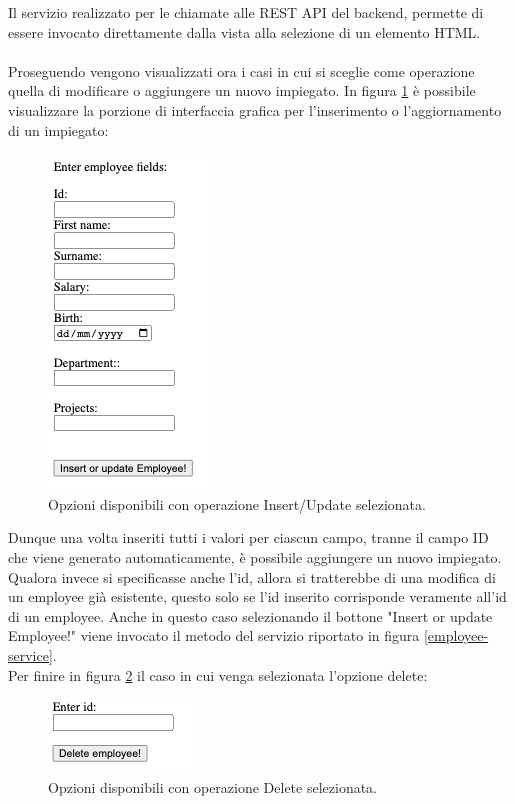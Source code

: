 \FloatBarrier
Il servizio realizzato per le chiamate alle REST API del backend, permette di essere invocato direttamente dalla vista alla selezione di un elemento HTML.\\\\
Proseguendo vengono visualizzati ora i casi in cui si sceglie come operazione quella di modificare o aggiungere un nuovo impiegato. In figura \ref{post-employee} è possibile visualizzare la porzione di interfaccia grafica per l'inserimento o l'aggiornamento di un impiegato:
\FloatBarrier
\begin{figure}[!ht]
\centering
\includegraphics[width=0.3\linewidth]{immagini/postEmployee.png}
\caption{Opzioni disponibili con operazione Insert/Update selezionata.}
\label{post-employee}
\end{figure}
\FloatBarrier
Dunque una volta inseriti tutti i valori per ciascun campo, tranne il campo ID che viene generato automaticamente, è possibile aggiungere un nuovo impiegato. Qualora invece si specificasse anche l'id, allora si tratterebbe di una modifica di un employee già esistente, questo solo se l'id inserito corrisponde veramente all'id di un employee. Anche in questo caso selezionando il bottone "Insert or update Employee!" viene invocato il metodo del servizio riportato in figura \ref{employee-service}.\\
Per finire in figura \ref{delete-employee} il caso in cui venga selezionata l'opzione delete:
\FloatBarrier
\begin{figure}[!ht]
\centering
\includegraphics[width=0.3\linewidth]{immagini/deleteEmployee.png}
\caption{Opzioni disponibili con operazione Delete selezionata.}
\label{delete-employee}
\end{figure}
\FloatBarrier
